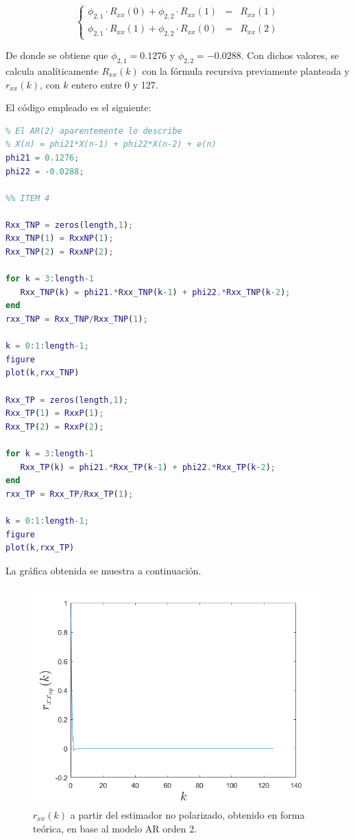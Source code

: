 \[
\left\{
\begin{array}{lll}
     \phi_{2,1} \cdot R_{xx}(0) + \phi_{2,2} \cdot R_{xx}(1) & = & R_{xx}(1) 
  \\ \phi_{2,1} \cdot R_{xx}(1) + \phi_{2,2} \cdot R_{xx}(0) & = & R_{xx}(2)
\end{array}
\right.
\]

De donde se obtiene que $\phi_{2,1} = 0.1276$ y $\phi_{2,2} = -0.0288$. Con dichos valores, se calcula anal\'iticamente $R_{xx}(k)$ con la fórmula recursiva previamente planteada y $ r_{xx}(k) $, con $k$ entero entre 0 y 127. 

El código empleado es el siguiente:

\begin{lstlisting}[language=Matlab, caption=EJ1.m]
%% ITEM 3
% El AR(2) aparentemente lo describe
% X(n) = phi21*X(n-1) + phi22*X(n-2) + e(n)
phi21 = 0.1276;
phi22 = -0.0288;

%% ITEM 4

Rxx_TNP = zeros(length,1);
Rxx_TNP(1) = RxxNP(1);
Rxx_TNP(2) = RxxNP(2);

for k = 3:length-1
   Rxx_TNP(k) = phi21.*Rxx_TNP(k-1) + phi22.*Rxx_TNP(k-2); 
end
rxx_TNP = Rxx_TNP/Rxx_TNP(1);

k = 0:1:length-1;
figure
plot(k,rxx_TNP)

Rxx_TP = zeros(length,1);
Rxx_TP(1) = RxxP(1);
Rxx_TP(2) = RxxP(2);

for k = 3:length-1
   Rxx_TP(k) = phi21.*Rxx_TP(k-1) + phi22.*Rxx_TP(k-2); 
end
rxx_TP = Rxx_TP/Rxx_TP(1);

k = 0:1:length-1;
figure
plot(k,rxx_TP)
\end{lstlisting}

La gráfica obtenida se muestra a continuación.

\begin{figure}[H] %
\centering
\includegraphics[scale=0.45]{../EJ1/rxxNPteorico}
\caption{$r_{xx}(k)$ a partir del estimador no polarizado, obtenido en forma teórica, en base al modelo AR orden 2.}
\label{rxxTeo}
\end{figure}

